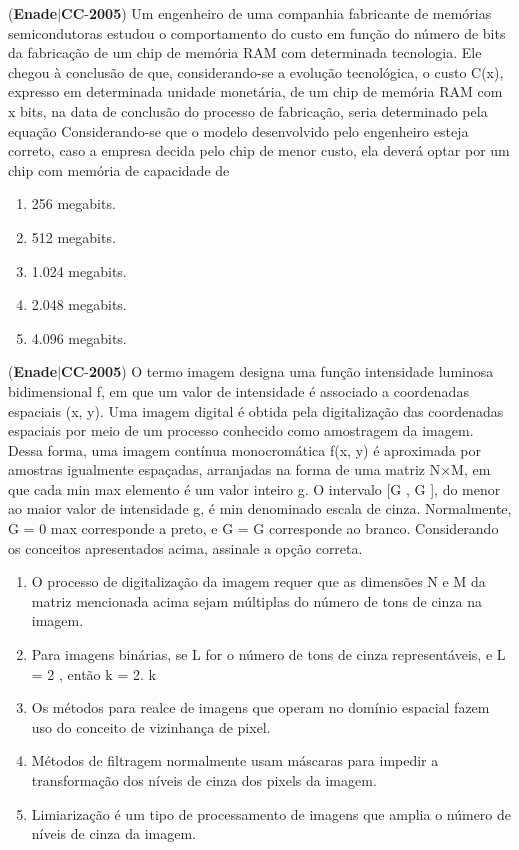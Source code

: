 \documentclass{exam}
\begin{document}
\begin{questions}
\begin{enumerate}[label=\alph*)]
	\end{enumerate}

\question (\textbf{Enade}$|$\textbf{CC}-\textbf{2005}) Um engenheiro de uma companhia fabricante de
memórias semicondutoras estudou o comportamento
do custo em função do número de bits da fabricação de
um chip de memória RAM com determinada
tecnologia. Ele chegou à conclusão de que,
considerando-se a evolução tecnológica, o custo C(x),
expresso em determinada unidade monetária, de um
chip de memória RAM com x bits, na data de conclusão
do processo de fabricação, seria determinado pela
equação
Considerando-se que o modelo desenvolvido pelo engenheiro
esteja correto, caso a empresa decida pelo chip de menor
custo, ela deverá optar por um chip com memória de
capacidade de
	\begin{enumerate}[label=\alph*)]
		\item  256 megabits.
		\item  512 megabits.
		\item  1.024 megabits.
		\item  2.048 megabits.
		\item  4.096 megabits.

	\end{enumerate}

\question (\textbf{Enade}$|$\textbf{CC}-\textbf{2005}) O termo imagem designa uma função
intensidade luminosa bidimensional f, em que um valor
de intensidade é associado a coordenadas espaciais
(x, y). Uma imagem digital é obtida pela digitalização
das coordenadas espaciais por meio de um processo
conhecido como amostragem da imagem. Dessa
forma, uma imagem contínua monocromática f(x, y) é
aproximada por amostras igualmente espaçadas,
arranjadas na forma de uma matriz N×M, em que cada
min max
elemento é um valor inteiro g. O intervalo [G , G ],
do menor ao maior valor de intensidade g, é
min
denominado escala de cinza. Normalmente, G = 0
max
corresponde a preto, e G = G corresponde ao
branco.
Considerando os conceitos apresentados acima, assinale a
opção correta.
	\begin{enumerate}[label=\alph*)]
		\item  O processo de digitalização da imagem requer que as
dimensões N e M da matriz mencionada acima sejam
múltiplas do número de tons de cinza na imagem.
		\item  Para imagens binárias, se L for o número de tons de cinza
representáveis, e L = 2 , então k = 2.
k
		\item  Os métodos para realce de imagens que operam no
domínio espacial fazem uso do conceito de vizinhança de
pixel.
		\item  Métodos de filtragem normalmente usam máscaras para
impedir a transformação dos níveis de cinza dos pixels da
imagem.
		\item  Limiarização é um tipo de processamento de imagens que
amplia o número de níveis de cinza da imagem.


\end{enumerate}
\end{questions}
\end{document}
